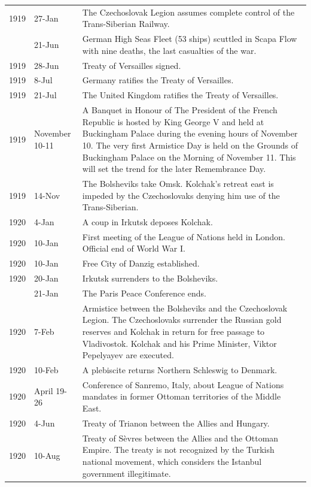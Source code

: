 \documentclass[
  openany]{book}
\begin{document}
\begin{longtable}[t]{rl>{\raggedright\arraybackslash}p{22em}}
\rowcolor{gray!6}  1919 & 27-Jan & The Czechoslovak Legion assumes complete control of the Trans-Siberian Railway.\\
\addlinespace
1919 & 21-Jun & German High Seas Fleet (53 ships) scuttled in Scapa Flow with nine deaths, the last casualties of the war.\\
\rowcolor{gray!6}  1919 & 28-Jun & Treaty of Versailles signed.\\
1919 & 8-Jul & Germany ratifies the Treaty of Versailles.\\
\rowcolor{gray!6}  1919 & 21-Jul & The United Kingdom ratifies the Treaty of Versailles.\\
1919 & November 10-11 & A Banquet in Honour of The President of the French Republic is hosted by King George V and held at Buckingham Palace during the evening hours of November 10. The very first Armistice Day is held on the Grounds of Buckingham Palace on the Morning of November 11. This will set the trend for the later Remembrance Day.\\
\addlinespace
\rowcolor{gray!6}  1919 & 14-Nov & The Bolsheviks take Omsk. Kolchak's retreat east is impeded by the Czechoslovaks denying him use of the Trans-Siberian.\\
1920 & 4-Jan & A coup in Irkutsk deposes Kolchak.\\
\rowcolor{gray!6}  1920 & 10-Jan & First meeting of the League of Nations held in London. Official end of World War I.\\
1920 & 10-Jan & Free City of Danzig established.\\
\rowcolor{gray!6}  1920 & 20-Jan & Irkutsk surrenders to the Bolsheviks.\\
\addlinespace
1920 & 21-Jan & The Paris Peace Conference ends.\\
\rowcolor{gray!6}  1920 & 7-Feb & Armistice between the Bolsheviks and the Czechoslovak Legion. The Czechoslovaks surrender the Russian gold reserves and Kolchak in return for free passage to Vladivostok. Kolchak and his Prime Minister, Viktor Pepelyayev are executed.\\
1920 & 10-Feb & A plebiscite returns Northern Schleswig to Denmark.\\
\rowcolor{gray!6}  1920 & April 19-26 & Conference of Sanremo, Italy, about League of Nations mandates in former Ottoman territories of the Middle East.\\
1920 & 4-Jun & Treaty of Trianon between the Allies and Hungary.\\
\addlinespace
\rowcolor{gray!6}  1920 & 10-Aug & Treaty of Sèvres between the Allies and the Ottoman Empire. The treaty is not recognized by the Turkish national movement, which considers the Istanbul government illegitimate.\\

\end{longtable}
\end{document}
